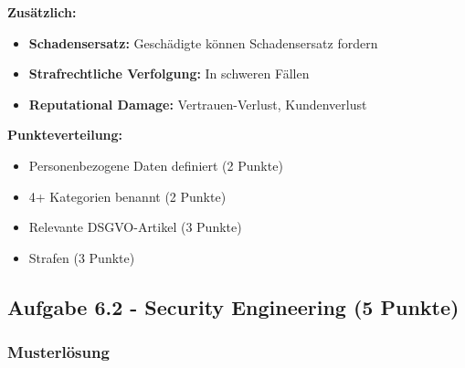 \documentclass[12pt,a4paper]{article}
\begin{document}
\begin{tcolorbox}[colback=solutionbg, colframe=black!30]
\textbf{Zusätzlich:}

\begin{itemize}
    \item \textbf{Schadensersatz:} Geschädigte können Schadensersatz fordern
    \item \textbf{Strafrechtliche Verfolgung:} In schweren Fällen
    \item \textbf{Reputational Damage:} Vertrauen-Verlust, Kundenverlust
\end{itemize}

\end{tcolorbox}

\textbf{Punkteverteilung:}
\begin{itemize}
    \item Personenbezogene Daten definiert (2 Punkte) \checkmark
    \item 4+ Kategorien benannt (2 Punkte) \checkmark
    \item Relevante DSGVO-Artikel (3 Punkte) \checkmark
    \item Strafen (3 Punkte) \checkmark
\end{itemize}

\subsection{Aufgabe 6.2 - Security Engineering (5 Punkte)}

\subsubsection*{Musterlösung}
\end{document}
